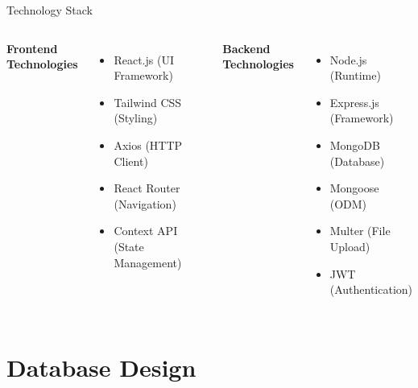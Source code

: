 \documentclass{beamer}
\begin{document}
\begin{frame}{Technology Stack}
\begin{columns}
\textbf{Frontend Technologies}
\begin{itemize}
    \item React.js (UI Framework)
    \item Tailwind CSS (Styling)
    \item Axios (HTTP Client)
    \item React Router (Navigation)
    \item Context API (State Management)
\end{itemize}

\textbf{Backend Technologies}
\begin{itemize}
    \item Node.js (Runtime)
    \item Express.js (Framework)
    \item MongoDB (Database)
    \item Mongoose (ODM)
    \item Multer (File Upload)
    \item JWT (Authentication)
\end{itemize}
\end{columns}
\end{frame}

\section{Database Design}
\end{document}
